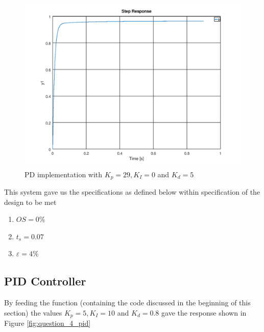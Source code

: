 \documentclass[a4paper, 12pt]{article}
\begin{document}
\begin{figure}[H]
	\centering
	\includegraphics[width=\textwidth]{Images/question_4_PD.png}
	\caption{PD implementation with $K_p = 29, K_I = 0$ and $K_d = 5$}
	\label{fig:question_4_pd}
\end{figure}

This system gave us the specifications as defined below within specification of the design to be met
\begin{enumerate}
	\item $OS = 0\%$
	\item $t_s = 0.07$
	\item $\varepsilon = 4\%$
\end{enumerate}


\subsection{PID Controller} %
\label{sub:pid_controller}
By feeding the function (containing the code discussed in the beginning of this
section) the values $K_p = 5, K_I = 10$ and $K_d = 0.8$ gave the response shown
in Figure \ref{fig:question_4_pid}
\end{document}
